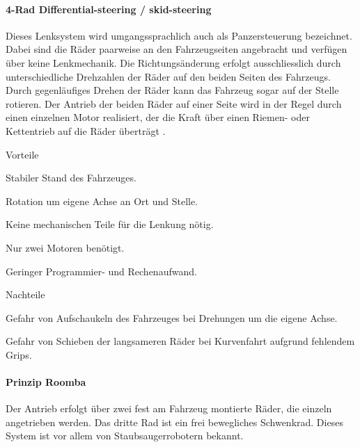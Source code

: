 \documentclass[../main.tex]{subfiles}
\begin{document}
\paragraph{4-Rad Differential-steering / skid-steering}
Dieses Lenksystem wird umgangssprachlich auch als Panzersteuerung bezeichnet. Dabei sind die Räder paarweise an den Fahrzeugseiten angebracht und verfügen über keine Lenkmechanik. Die Richtungsänderung erfolgt ausschliesslich durch unterschiedliche Drehzahlen der Räder auf den beiden Seiten des Fahrzeugs. Durch gegenläufiges Drehen der Räder kann das Fahrzeug sogar auf der Stelle rotieren. Der Antrieb der beiden Räder auf einer Seite wird in der Regel durch einen einzelnen Motor realisiert, der die Kraft über einen Riemen- oder Kettentrieb auf die Räder überträgt \cite{skid_steering}.

\begin{minipage}[t]{0.48\textwidth}
    \begin{items}
        \item[Vorteile]
        \item Stabiler Stand des Fahrzeuges.
        \item Rotation um eigene Achse an Ort und Stelle.
        \item Keine mechanischen Teile für die Lenkung nötig.
        \item Nur zwei Motoren benötigt.
        \item Geringer Programmier- und Rechenaufwand.
    \end{items}
\end{minipage}
\begin{minipage}[t]{0.48\textwidth}
    \begin{items}
      \item [Nachteile]
      \item Gefahr von Aufschaukeln des Fahrzeuges bei Drehungen um die eigene Achse.
      \item Gefahr von Schieben der langsameren Räder bei Kurvenfahrt aufgrund fehlendem Grips.
    \end{items}
\end{minipage}

\paragraph{Prinzip Roomba} \label{recherche-prinzip-roomba}
Der Antrieb erfolgt über zwei fest am Fahrzeug montierte Räder, die einzeln angetrieben werden. Das dritte Rad ist ein frei bewegliches Schwenkrad. Dieses System ist vor allem von Staubsaugerrobotern bekannt.
\end{document}

